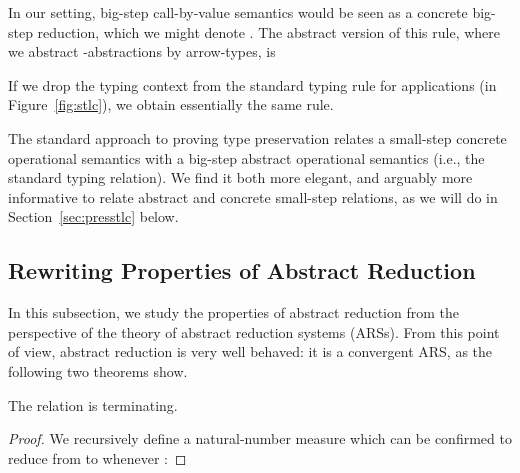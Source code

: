 \documentclass{LMCS}
\begin{document}
\noindent In our setting, big-step call-by-value semantics would be
seen as a concrete big-step reduction, which we might denote
.  The abstract version of this rule, where we abstract
-abstractions by arrow-types, is

\noindent If we drop the typing context from the standard typing rule
for applications (in Figure~\ref{fig:stlc}), we obtain essentially
the same rule.

The standard approach to proving type preservation relates a
small-step concrete operational semantics with a big-step abstract
operational semantics (i.e., the standard typing relation).  We find
it both more elegant, and arguably more informative to relate abstract
and concrete small-step relations, as we will do in Section~\ref{sec:presstlc} below.

\subsection{Rewriting Properties of Abstract Reduction}

In this subsection, we study the properties of abstract reduction from
the perspective of the theory of abstract reduction systems (ARSs).
From this point of view, abstract reduction is very well behaved: it
is a convergent ARS, as the following two theorems show.

\begin{thm}
\label{thm:termabstr}
The relation  is terminating.
\end{thm}
\begin{proof} We recursively define a natural-number measure  which can be confirmed to reduce from  to  
whenever :

\end{proof}
\end{document}
